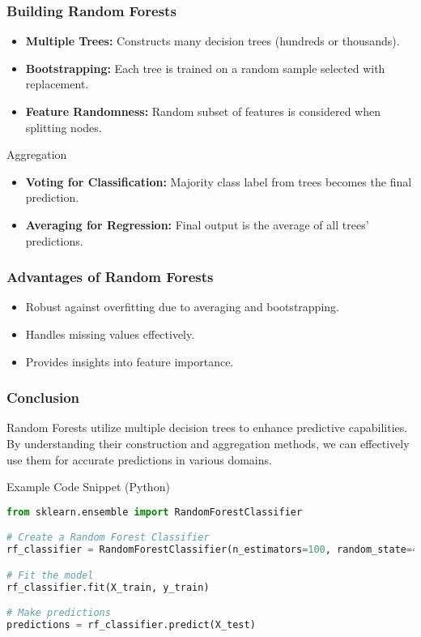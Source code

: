\documentclass{beamer}
\begin{document}
\begin{frame}[fragile]
    \frametitle{Building Random Forests}
    \begin{itemize}
        \item \textbf{Multiple Trees:} Constructs many decision trees (hundreds or thousands).
        \item \textbf{Bootstrapping:} Each tree is trained on a random sample selected with replacement.
        \item \textbf{Feature Randomness:} Random subset of features is considered when splitting nodes.
    \end{itemize}

    \begin{block}{Aggregation}
        \begin{itemize}
            \item \textbf{Voting for Classification:} Majority class label from trees becomes the final prediction.
            \item \textbf{Averaging for Regression:} Final output is the average of all trees' predictions.
        \end{itemize}
    \end{block}
\end{frame}

\begin{frame}[fragile]
    \frametitle{Advantages of Random Forests}
    \begin{itemize}
        \item Robust against overfitting due to averaging and bootstrapping.
        \item Handles missing values effectively.
        \item Provides insights into feature importance.
    \end{itemize}
\end{frame}

\begin{frame}[fragile]
    \frametitle{Conclusion}
    Random Forests utilize multiple decision trees to enhance predictive capabilities. By understanding their construction and aggregation methods, we can effectively use them for accurate predictions in various domains.

    \begin{block}{Example Code Snippet (Python)}
        \begin{lstlisting}[language=Python]
from sklearn.ensemble import RandomForestClassifier

# Create a Random Forest Classifier
rf_classifier = RandomForestClassifier(n_estimators=100, random_state=42)

# Fit the model
rf_classifier.fit(X_train, y_train)

# Make predictions
predictions = rf_classifier.predict(X_test)
        \end{lstlisting}
    \end{block}
\end{frame}
\end{document}
